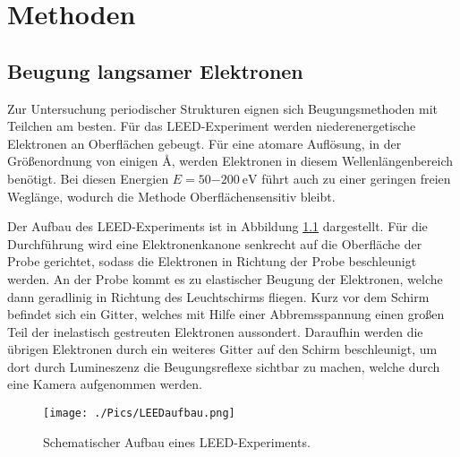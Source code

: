 \chapter{Methoden}\label{make}

\section{Beugung langsamer Elektronen}
Zur Untersuchung periodischer Strukturen eignen sich Beugungsmethoden mit Teilchen am besten. Für das LEED-Experiment werden niederenergetische Elektronen
an Oberflächen gebeugt. Für eine atomare Auflösung, in der Größenordnung von einigen \si{\angstrom}, werden Elektronen in diesem Wellenlängenbereich benötigt.
Bei diesen Energien $E =  \SI{50-200}{\eV}$ führt auch zu einer geringen freien Weglänge, wodurch die Methode Oberflächensensitiv bleibt.

Der Aufbau des LEED-Experiments ist in Abbildung \ref{pic:LEED} dargestellt.
Für die Durchführung wird eine Elektronenkanone senkrecht auf die Oberfläche der Probe gerichtet, sodass die Elektronen in Richtung der Probe beschleunigt werden. An der Probe kommt es zu elastischer Beugung der Elektronen, welche dann geradlinig in Richtung des Leuchtschirms fliegen. Kurz vor dem Schirm befindet sich ein
Gitter, welches mit Hilfe einer Abbremsspannung einen großen Teil der inelastisch gestreuten Elektronen aussondert. Daraufhin werden die übrigen Elektronen durch ein weiteres Gitter auf den Schirm beschleunigt, um
dort durch Lumineszenz die Beugungsreflexe sichtbar zu machen, welche durch eine Kamera aufgenommen werden.
\begin{figure}
    \centering
    \texttt{[image: ./Pics/LEEDaufbau.png]}
    \caption{Schematischer Aufbau eines LEED-Experiments.\cite{Oberflächenphysik}}
    \label{pic:LEED}
\end{figure}
